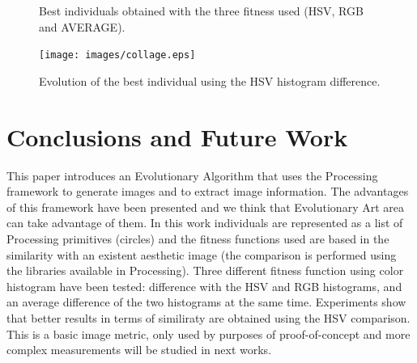 \documentclass[conference]{IEEEtran}
\begin{document}
\begin{figure}[ht]
{ }
\caption{Best individuals obtained with the three fitness used (HSV, RGB and AVERAGE).}
\label{fig:bestinds}
\end{figure}

\begin{figure}
   \texttt{[image: images/collage.eps]}
\caption{Evolution of the best individual using the HSV histogram difference. }
\label{fig:collage}
\end{figure}

\section{Conclusions and Future Work}
\label{sec:conclusions}
This paper introduces an Evolutionary Algorithm that uses the Processing framework to generate images and to extract image information. The advantages of this framework have been presented and we think that Evolutionary Art area can take advantage of them. In this work individuals are represented as a list of Processing primitives (circles) and the fitness functions used are based in the similarity with an existent aesthetic image (the comparison is performed using the libraries available in Processing). Three different fitness function using color histogram have been tested: difference with the HSV and RGB histograms, and an average difference of the two histograms at the same time. Experiments show that better results in terms of similiraty are obtained using the HSV comparison. This is a basic image metric, only used by purposes of proof-of-concept and more complex measurements will be studied in next works.
\end{document}
